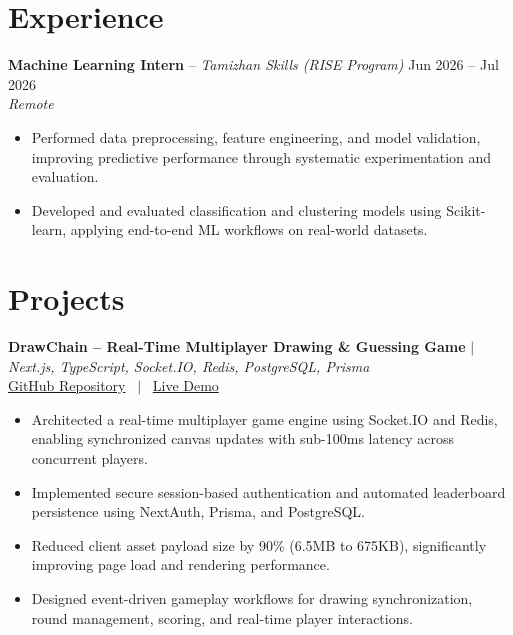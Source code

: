 \documentclass[10pt, a4paper]{article}
\begin{document}

\section{Experience}

\textbf{Machine Learning Intern} -- \textit{Tamizhan Skills (RISE Program)} \hfill Jun 2026 -- Jul 2026 \\
\textit{\small{Remote}} \\
\begin{itemize}

    \item Performed data preprocessing, feature engineering, and model validation, improving predictive performance through systematic experimentation and evaluation.

    \item Developed and evaluated classification and clustering models using Scikit-learn, applying end-to-end ML workflows on real-world datasets.

\end{itemize}
\vspace{2pt}



\section{Projects}

\textbf{DrawChain -- Real-Time Multiplayer Drawing \& Guessing Game} $|$ \textit{Next.js, TypeScript, Socket.IO, Redis, PostgreSQL, Prisma} \\

\small{
\href{https://github.com/PankajKumar-11/DrawChain}{GitHub Repository}
 \ $|$ \ \href{https://demo.example.com}{Live Demo}
} \\

\begin{itemize}

    \item Architected a real-time multiplayer game engine using Socket.IO and Redis, enabling synchronized canvas updates with sub-100ms latency across concurrent players.

    \item Implemented secure session-based authentication and automated leaderboard persistence using NextAuth, Prisma, and PostgreSQL.

    \item Reduced client asset payload size by 90\% (6.5MB to 675KB), significantly improving page load and rendering performance.

    \item Designed event-driven gameplay workflows for drawing synchronization, round management, scoring, and real-time player interactions.

\end{itemize}
\vspace{2pt}
\end{document}
